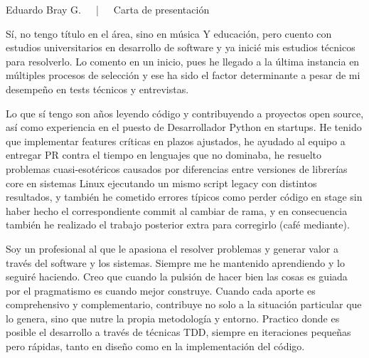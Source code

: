 \documentclass[12pt, a4paper]{awesome-cv}
\begin{document}
\makecvheader[R]

\makecvfooter
{}
{Eduardo Bray G.~~~|~~~Carta de presentación}
{}

\makelettertitle

\begin{cvletter}

    Sí, no tengo título en el área, sino en música Y educación, pero cuento con
    estudios universitarios en desarrollo de software y ya inicié mis estudios
    técnicos para resolverlo. Lo comento en un inicio, pues he llegado a la
    última instancia en múltiples procesos de selección y ese ha sido el factor
    determinante a pesar de mi desempeño en tests técnicos y entrevistas.

    Lo que sí tengo son años leyendo código y contribuyendo a proyectos open
    source, así como experiencia en el puesto de Desarrollador Python en
    startups. He tenido que implementar features críticas en plazos ajustados,
    he ayudado al equipo a entregar PR contra el tiempo en lenguajes que no
    dominaba, he resuelto problemas cuasi-esotéricos causados por diferencias
    entre versiones de librerías core en sistemas Linux ejecutando un mismo
    script legacy con distintos resultados, y también he cometido errores
    típicos como perder código en stage sin haber hecho el correspondiente
    commit al cambiar de rama, y en consecuencia también he realizado el trabajo
    posterior extra para corregirlo (café mediante).

    Soy un profesional al que le apasiona el resolver problemas y generar valor
    a través del software y los sistemas. Siempre me he mantenido aprendiendo y
    lo seguiré haciendo. Creo que cuando la pulsión de hacer bien las cosas es
    guiada por el pragmatismo es cuando mejor construye. Cuando cada aporte es
    comprehensivo y complementario, contribuye no solo a la situación particular
    que lo genera, sino que nutre la propia metodología y entorno. Practico
    donde es posible el desarrollo a través de técnicas TDD, siempre en
    iteraciones pequeñas pero rápidas, tanto en diseño como en la implementación
    del código.


\end{cvletter}
\end{document}
